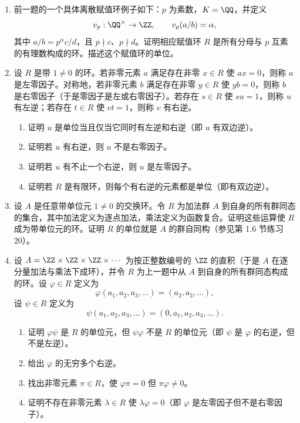 \begin{enumerate}[label=\arabic*.]
\begin{enumerate}[label=(\alph*)]
		\item 证明 $R$ 是 $K$ 的含单位元子环。（一般地，若存在域 $K$ 和离散赋值 $v$，使 $R$ 是 $v$ 的赋值环，则称 $R$ 为离散赋值环。）
		\item 证明对每个非零 $x\in K$，$x$ 或 $x^{-1}$ 属于 $R$。
		\item 证明 $x$ 是 $R$ 的单位当且仅当 $v(x)=0$。
	\end{enumerate}
	\item 前一题的一个具体离散赋值环例子如下：$p$ 为素数，$K=\QQ$，并定义
	\[
	v_p:\QQ^\times\to\ZZ,
	\qquad v_p(a/b)=\alpha,
	\]
	其中 $a/b=p^\alpha c/d$，且 $p\nmid c$、$p\nmid d$。证明相应赋值环 $R$ 是所有分母与 $p$ 互素的有理数构成的环。描述这个赋值环的单位。
	\item 设 $R$ 是带 $1\neq0$ 的环。若非零元素 $a$ 满足存在非零 $x\in R$ 使 $ax=0$，则称 $a$ 是左零因子。对称地，若非零元素 $b$ 满足存在非零 $y\in R$ 使 $yb=0$，则称 $b$ 是右零因子（于是零因子是左或右零因子）。若存在 $s\in R$ 使 $su=1$，则称 $u$ 有左逆；若存在 $t\in R$ 使 $vt=1$，则称 $v$ 有右逆。
	\begin{enumerate}[label=(\alph*)]
		\item 证明 $u$ 是单位当且仅当它同时有左逆和右逆（即 $u$ 有双边逆）。
		\item 证明若 $u$ 有右逆，则 $u$ 不是右零因子。
		\item 证明若 $u$ 有不止一个右逆，则 $u$ 是左零因子。
		\item 证明若 $R$ 是有限环，则每个有右逆的元素都是单位（即有双边逆）。
	\end{enumerate}
	\item 设 $A$ 是任意带单位元 $1\neq0$ 的交换环。令 $R$ 为加法群 $A$ 到自身的所有群同态的集合，其中加法定义为逐点加法，乘法定义为函数复合。证明这些运算使 $R$ 成为带单位元的环。证明 $R$ 的单位就是 $A$ 的群自同构（参见第 1.6 节练习 20）。
	\item 设 $A=\ZZ\times\ZZ\times\ZZ\times\cdots$ 为按正整数编号的 $\ZZ$ 的直积（于是 $A$ 在逐分量加法与乘法下成环），并令 $R$ 为上一题中从 $A$ 到自身的所有群同态构成的环。设 $\varphi\in R$ 定义为
	\[
	\varphi(a_1,a_2,a_3,\ldots)=(a_2,a_3,\ldots),
	\]
	设 $\psi\in R$ 定义为
	\[
	\psi(a_1,a_2,a_3,\ldots)=(0,a_1,a_2,a_3,\ldots).
	\]
	\begin{enumerate}[label=(\alph*)]
		\item 证明 $\varphi\psi$ 是 $R$ 的单位元，但 $\psi\varphi$ 不是 $R$ 的单位元（即 $\psi$ 是 $\varphi$ 的右逆，但不是左逆）。
		\item 给出 $\varphi$ 的无穷多个右逆。
		\item 找出非零元素 $\pi\in R$，使 $\varphi\pi=0$ 但 $\pi\varphi\neq0$。
		\item 证明不存在非零元素 $\lambda\in R$ 使 $\lambda\varphi=0$（即 $\varphi$ 是左零因子但不是右零因子）。
	\end{enumerate}
\end{enumerate}



